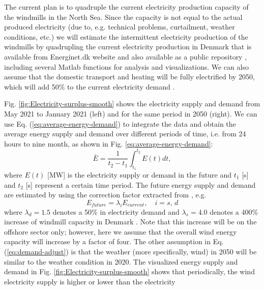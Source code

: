 \documentclass{ECOS_2021}
\begin{document}
The current plan is to quadruple the current
electricity production capacity of the windmills in the North Sea. Since the
capacity is not equal to the actual produced electricity (due to,
e.g. technical problems, curtailment, weather conditions, etc.) we
will estimate the intermittent electricity production of the windmills
by quadrupling the current electricity production in Denmark that
is available from Energinet.dk website and also available as a public
repository \cite{eftekhariSimulkadeStorageFirst2021}, including several
Matlab functions for analysis and visualizations. We can also assume that the 
domestic transport and heating will be fully electrified by 2050, which will add 50\% 
to the current electricity demand \cite{eftekhariQuantifyingRoleLiquid2020}.

Fig. \ref{fig:Electricity-surplus-smooth} shows the electricity supply
and demand from May 2021 to January 2021 (left) and for the same period
in 2050 (right). We can use Eq. (\ref{eq:average-energy-demand})
to integrate the data and obtain the average energy supply and demand
over different periods of time, i.e. from 24 hours to nine month,
as shown in Fig. \ref{eq:average-energy-demand}:
\begin{equation}
\bar{E}=\frac{1}{t_{2}-t_{1}}\int_{t_{1}}^{t_{2}}E\left(t\right)dt,\label{eq:average-energy-demand}
\end{equation}
where $E(t)$ {[}MW{]} is the electricity supply or demand in the
future and $t_{1}$ {[}s{]} and $t_{2}$ {[}s{]} represent a certain
time period. The future energy supply and demand are estimated by
using the correction factor extracted from \cite{eftekhariQuantifyingRoleLiquid2020},
e.g.
\begin{equation}
E_{future}=\lambda_{i}E_{current},\quad i=s,\,d\label{eq:demand-adjust}
\end{equation}
where $\lambda_{d}=1.5$ denotes a 50\% in electricity demand \cite{eftekhariQuantifyingRoleLiquid2020}
and $\lambda_{s}=4.0$ denotes a 400\% increase of windmill capacity
in Denmark \cite{danishenergyagencyEnergyIslands2021,dandreaSynergiesOffshoreEnergy2021}.
Note that this increase will be on the offshore sector only; however,
here we assume that the overall wind energy capacity will increase
by a factor of four. The other assumption in Eq. (\ref{eq:demand-adjust})
is that the weather (more specifically, wind) in 2050 will be similar
to the weather condition in 2020. The visualized energy supply and
demand in Fig. \ref{fig:Electricity-surplus-smooth} shows that periodically,
the wind electricity supply is higher or lower than the electricity
\end{document}
